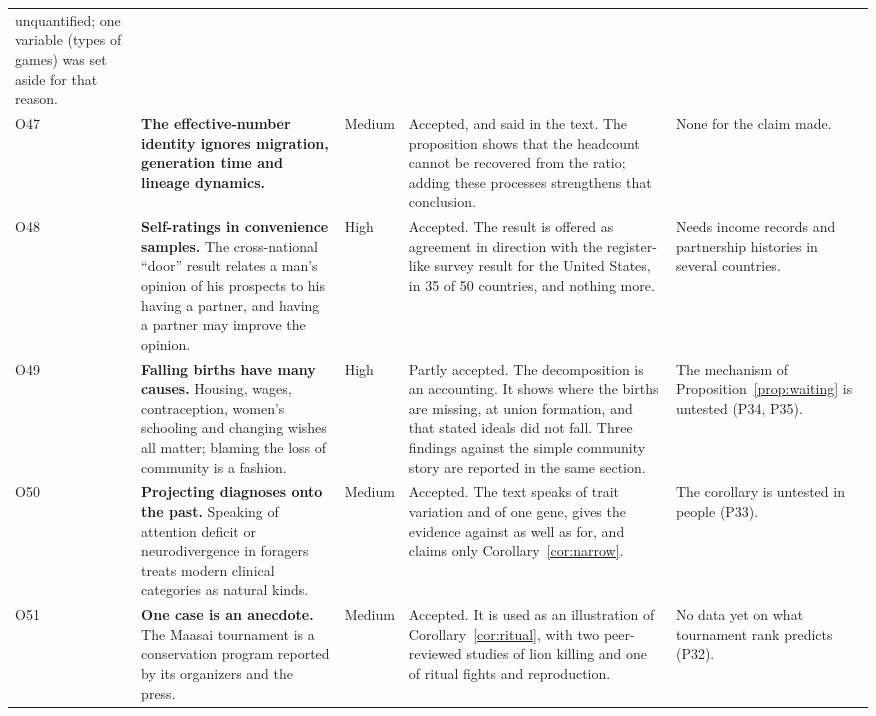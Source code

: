 \begin{table}[tp]
\begin{tabularx}{\textwidth}{@{}P{0.028\textwidth}P{0.225\textwidth}P{0.05\textwidth}LP{0.19\textwidth}@{}}
unquantified; one variable (types of games) was set aside for that reason.\\
O47 & \textbf{The effective-number identity ignores migration, generation time and lineage dynamics.} & Medium &
Accepted, and said in the text. The proposition shows that the headcount cannot be recovered from the ratio; adding these
processes strengthens that conclusion. & None for the claim made.\\
O48 & \textbf{Self-ratings in convenience samples.} The cross-national ``door'' result relates a man's opinion of his
prospects to his having a partner, and having a partner may improve the opinion. & High & Accepted. The result is offered
as agreement in direction with the register-like survey result for the United States, in 35 of 50 countries, and nothing
more. & Needs income records and partnership histories in several countries.\\
O49 & \textbf{Falling births have many causes.} Housing, wages, contraception, women's schooling and changing wishes all
matter; blaming the loss of community is a fashion. & High & Partly accepted. The decomposition is an accounting. It shows
where the births are missing, at union formation, and that stated ideals did not fall. Three findings against the simple
community story are reported in the same section. & The mechanism of Proposition~\ref{prop:waiting} is untested (P34,
P35).\\
O50 & \textbf{Projecting diagnoses onto the past.} Speaking of attention deficit or neurodivergence in foragers treats
modern clinical categories as natural kinds. & Medium & Accepted. The text speaks of trait variation and of one gene, gives
the evidence against as well as for, and claims only Corollary~\ref{cor:narrow}. & The corollary is untested in people
(P33).\\
O51 & \textbf{One case is an anecdote.} The Maasai tournament is a conservation program reported by its organizers and
the press. & Medium & Accepted. It is used as an illustration of Corollary~\ref{cor:ritual}, with two peer-reviewed
studies of lion killing and one of ritual fights and reproduction. & No data yet on what tournament rank predicts
(P32).\\
\bottomrule
\end{tabularx}
\end{table}
